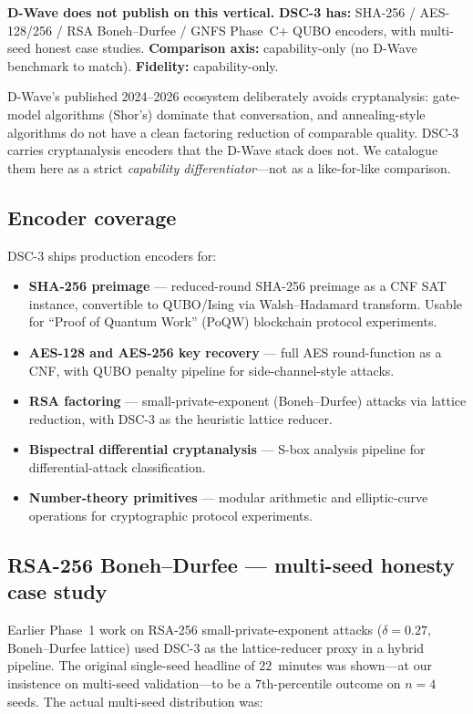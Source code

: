 \documentclass[11pt,a4paper]{article}
\begin{document}
\textbf{D-Wave does not publish on this vertical.}
\textbf{DSC-3 has:} SHA-256 / AES-128/256 / RSA Boneh--Durfee / GNFS
Phase~C+ QUBO encoders, with multi-seed honest case studies.
\textbf{Comparison axis:} capability-only (no D-Wave benchmark to
match).
\textbf{Fidelity:} capability-only.

D-Wave's published 2024--2026 ecosystem deliberately avoids cryptanalysis:
gate-model algorithms (Shor's) dominate that conversation, and
annealing-style algorithms do not have a clean factoring reduction of
comparable quality. DSC-3 carries cryptanalysis encoders that the D-Wave
stack does not. We catalogue them here as a strict
\emph{capability differentiator}---not as a like-for-like comparison.

\subsection{Encoder coverage}

DSC-3 ships production encoders for:

\begin{itemize}\itemsep0.15em
\item[$\bullet$] \textbf{SHA-256 preimage} — reduced-round SHA-256 preimage
  as a CNF SAT instance, convertible to QUBO/Ising via Walsh--Hadamard
  transform. Usable for ``Proof of Quantum Work'' (PoQW) blockchain
  protocol experiments.
\item[$\bullet$] \textbf{AES-128 and AES-256 key recovery} — full AES
  round-function as a CNF, with QUBO penalty pipeline for side-channel-style
  attacks.
\item[$\bullet$] \textbf{RSA factoring} — small-private-exponent
  (Boneh--Durfee) attacks via lattice reduction, with DSC-3 as the
  heuristic lattice reducer.
\item[$\bullet$] \textbf{Bispectral differential cryptanalysis} — S-box
  analysis pipeline for differential-attack classification.
\item[$\bullet$] \textbf{Number-theory primitives} — modular arithmetic
  and elliptic-curve operations for cryptographic protocol experiments.
\end{itemize}

\subsection{RSA-256 Boneh--Durfee — multi-seed honesty case study}

Earlier Phase~1 work on RSA-256 small-private-exponent attacks
($\delta\!=\!0.27$, Boneh--Durfee lattice) used DSC-3 as the
lattice-reducer proxy in a hybrid pipeline. The original single-seed
headline of $22$~minutes was shown---at our insistence on multi-seed
validation---to be a 7th-percentile outcome on $n\!=\!4$ seeds. The
actual multi-seed distribution was:
\end{document}
